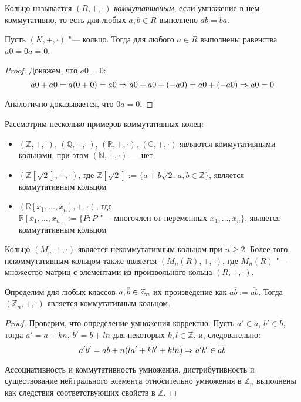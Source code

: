 \begin{definition}
	Кольцо называется $(R, +, \cdot)$ \textit{коммутативным}, если умножение в нем коммутативно, то есть для любых $a, b \in R$ выполнено $ab = ba$.
\end{definition}

\begin{proposition}
	Пусть $(K, +, \cdot)$ "--- кольцо. Тогда для любого $a \in R$ выполнены равенства $a0 = 0a = 0$.
\end{proposition}

\begin{proof}
	Докажем, что $a0 = 0$:
	\[a0 + a0 = a(0 + 0) = a0 \Rightarrow a0 + a0 + (-a0) = a0 + (-a0) \Rightarrow a0 = 0\]
	
	Аналогично доказывается, что $0a = 0$.
\end{proof}

\begin{example}
	Рассмотрим несколько примеров коммутативных колец:
	\begin{itemize}
		\item $(\mathbb{Z}, +, \cdot)$, $(\mathbb{Q}, +, \cdot)$, $(\mathbb{R}, +, \cdot)$, $(\mathbb{C}, +, \cdot)$ являются коммутативными кольцами, при этом $(\mathbb{N}, +, \cdot)$ --- нет
		\item $(\mathbb{Z}[\sqrt{2}], +, \cdot)$, где $\mathbb{Z}[\sqrt{2}] := \{a + b\sqrt{2}: a, b \in \mathbb{Z}\}$, является коммутативным кольцом
		\item $(\mathbb{R}[x_1, \dotsc, x_n], +, \cdot)$, где $\mathbb{R}[x_1, \dotsc, x_n] := \{P: P \text{ "--- многочлен от переменных } x_1, \dotsc, x_n\}$, является коммутативным кольцом
	\end{itemize}
\end{example}

\begin{example}
	Кольцо $(M_n, +, \cdot)$ является некоммутативным кольцом при $n \ge 2$. Более того, некоммутативным кольцом также является $(M_n(R), +, \cdot)$, где $M_n(R)$ "--- множество матриц с элементами из произвольного кольца $(R, +, \cdot)$.
\end{example}

\begin{proposition}
	Определим для любых классов $\overline a, \overline b \in \mathbb{Z}_n$ их произведение как $\overline{a}\overline{b} := \overline{ab}$. Тогда $(\mathbb{Z}_n, +, \cdot)$ является коммутативным кольцом.
\end{proposition}

\begin{proof}
	Проверим, что определение умножения корректно. Пусть $a' \in \overline{a}$, $b' \in \overline{b}$, тогда $a' = a + kn$, $b' = b + ln$ для некоторых $k, l \in \mathbb{Z}$, и, следовательно:
	\[a'b' = ab + n(la' + kb' + kln) \Rightarrow a'b' \in \overline{ab}\]
	
	Ассоциативность и коммутативность умножения, дистрибутивность и существование нейтрального элемента относительно умножения в $\mathbb{Z}_n$ выполнены как следствия соответствующих свойств в $\mathbb{Z}$.
\end{proof}

